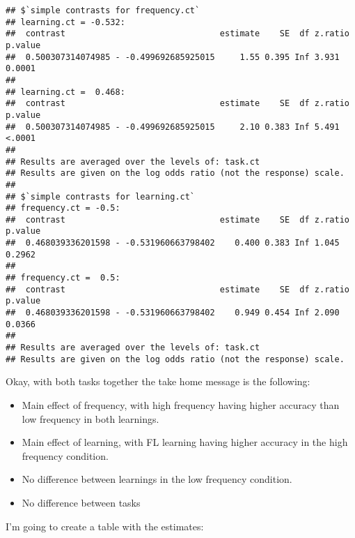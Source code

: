 \documentclass[
]{article}
\begin{document}
\begin{verbatim}
## $`simple contrasts for frequency.ct`
## learning.ct = -0.532:
##  contrast                               estimate    SE  df z.ratio p.value
##  0.500307314074985 - -0.499692685925015     1.55 0.395 Inf 3.931   0.0001 
## 
## learning.ct =  0.468:
##  contrast                               estimate    SE  df z.ratio p.value
##  0.500307314074985 - -0.499692685925015     2.10 0.383 Inf 5.491   <.0001 
## 
## Results are averaged over the levels of: task.ct 
## Results are given on the log odds ratio (not the response) scale. 
## 
## $`simple contrasts for learning.ct`
## frequency.ct = -0.5:
##  contrast                               estimate    SE  df z.ratio p.value
##  0.468039336201598 - -0.531960663798402    0.400 0.383 Inf 1.045   0.2962 
## 
## frequency.ct =  0.5:
##  contrast                               estimate    SE  df z.ratio p.value
##  0.468039336201598 - -0.531960663798402    0.949 0.454 Inf 2.090   0.0366 
## 
## Results are averaged over the levels of: task.ct 
## Results are given on the log odds ratio (not the response) scale.
\end{verbatim}

Okay, with both tasks together the take home message is the following:

\begin{itemize}
\item
  Main effect of frequency, with high frequency having higher accuracy
  than low frequency in both learnings.
\item
  Main effect of learning, with FL learning having higher accuracy in
  the high frequency condition.
\item
  No difference between learnings in the low frequency condition.
\item
  No difference between tasks
\end{itemize}

I'm going to create a table with the estimates:
\end{document}
